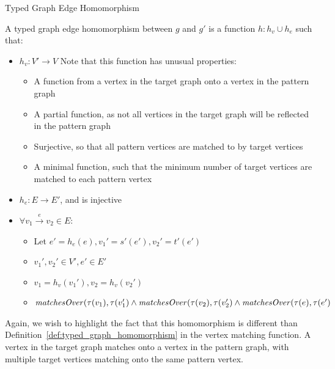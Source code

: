 \begin{definition}{Typed Graph Edge Homomorphism\\}
\label{def:typed_graph_edge_homomorphism}

A typed graph edge homomorphism between $g$ and $g'$ is a function $h: h_v \cup h_e$ such that:
\begin{itemize}
\item $h_v: V'\rightarrow V$ Note that this function has unusual properties:
\begin{itemize}

\item A function from a vertex in the target graph onto a vertex in the pattern graph
\item A partial function, as not all vertices in the target graph will be reflected in the pattern graph
\item Surjective, so that all pattern vertices are matched to by target vertices
\item A minimal function, such that the minimum number of target vertices are matched to each pattern vertex 
\end{itemize}
\item $h_e: E\rightarrow E'$, and is injective
\item $\forall v_1 \xrightarrow{e} v_2\in E$:
\begin{itemize}
\item Let $e' = h_e(e), v_1' = s'(e'), v_2' = t'(e')$
\item $v_1', v_2' \in V', e' \in E'$
\item $v_1 = h_v(v_1'), v_2 = h_v(v_2')$
\item $\mathit{matchesOver}(\tau(v_1), \tau(v_1') \land \\\mathit{matchesOver}(\tau(v_2), \tau(v_2') \land\\ \mathit{matchesOver}(\tau(e), \tau(e')$
\end{itemize}
 
\end{itemize}  
\end{definition}

Again, we wish to highlight the fact that this homomorphism is different than Definition~\ref{def:typed_graph_homomorphism} in the vertex matching function. A vertex in the target graph matches onto a vertex in the pattern graph, with multiple target vertices matching onto the same pattern vertex. 

